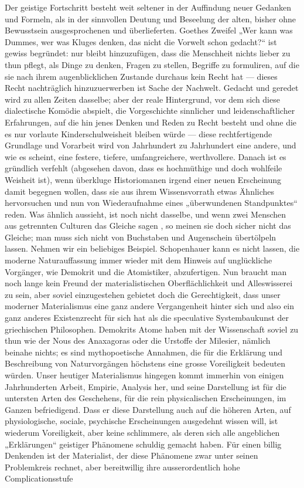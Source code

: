 Der geistige Fortschritt besteht weit seltener in der Auffindung neuer Gedanken und Formeln, als in der sinnvollen Deutung und Beseelung der alten, bisher ohne Bewusstsein ausgesprochenen und überlieferten. Goethes Zweifel „Wer kann was Dummes, wer was Kluges denken, das nicht die Vorwelt schon gedacht?“ ist gewiss begründet: nur bleibt hinzuzufügen, dass die Menschheit nichts lieber zu thun pflegt, als Dinge zu denken, Fragen zu stellen, Begriffe zu formuliren, auf die sie nach ihrem augenblicklichen Zustande durchaus kein Recht hat — dieses Recht nachträglich hinzuzuerwerben ist Sache der Nachwelt. Gedacht und geredet wird zu allen Zeiten dasselbe; aber der reale Hintergrund, vor dem sich diese dialectische Komödie abspielt, die Vorgeschichte sinnlicher und leidenschaftlicher Erfahrungen, auf die hin jenes Denken und Reden zu Recht besteht und ohne die es nur vorlaute Kinderschulweisheit bleiben würde — diese rechtfertigende Grundlage und Vorarbeit wird von Jahrhundert zu Jahrhundert eine andere, und wie es scheint, eine festere, tiefere, umfangreichere, werthvollere. Danach ist es gründlich verfehlt (abgesehen davon, dass es hochmüthige und doch wohlfeile Weisheit ist), wenn überkluge Historiomanen irgend einer neuen Erscheinung damit begegnen wollen, dass sie aus ihrem Wissensvorrath etwas Ähnliches hervorsuchen und nun von Wiederaufnahme eines „überwundenen Standpunktes“ reden. Was  ähnlich aussieht, ist  noch nicht dasselbe, und wenn zwei Menschen aus getrennten Culturen das Gleiche sagen , so meinen sie doch sicher nicht das Gleiche; man muss sich nicht von Buchstaben und Augenschein übertölpeln lassen. Nehmen wir ein beliebiges Beispiel. Schopenhauer kann es nicht lassen, die moderne  Naturauffassung immer wieder mit dem Hinweis auf unglückliche Vorgänger, wie Demokrit und die Atomistiker, abzufertigen. Nun braucht man noch lange kein Freund der materialistischen Oberflächlichkeit und Alleswisserei zu sein, aber soviel einzugestehen gebietet doch die Gerechtigkeit, dass unser moderner Materialismus eine ganz andere Vergangenheit hinter sich und also ein ganz anderes Existenzrecht für sich hat als die speculative Systembaukunst der griechischen Philosophen. Demokrits Atome haben mit der Wissenschaft soviel zu thun wie der Nous des Anaxagoras oder die Urstoffe der Milesier, nämlich beinahe nichts; es sind mythopoetische Annahmen, die für die Erklärung und Beschreibung von Naturvorgängen höchstens eine grosse Voreiligkeit bedeuten würden. Unser heutiger Materialismus hingegen kommt immerhin von einigen Jahrhunderten Arbeit, Empirie, Analysis her, und seine Darstellung ist für die untersten Arten des Geschehens, für die rein physicalischen Erscheinungen, im Ganzen befriedigend. Dass er diese Darstellung auch auf die höheren Arten, auf physiologische, sociale, psychische Erscheinungen ausgedehnt wissen will, ist wiederum  Voreiligkeit, aber keine schlimmere, als deren sich alle angeblichen „Erklärungen“ geistiger Phänomene schuldig gemacht haben. Für einen billig Denkenden ist der Materialist, der diese Phänomene zwar unter seinen Problemkreis rechnet, aber bereitwillig ihre ausserordentlich hohe Complicationsstufe 